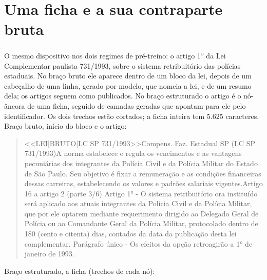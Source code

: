 \documentclass{IOS-Book-Article}
\begin{document}
\section{Uma ficha e a sua contraparte bruta}
O mesmo dispositivo nos dois regimes de pré-treino: o artigo 1\textsuperscript{o} da Lei Complementar paulista 731/1993, sobre o sistema retribuitório das polícias estaduais. No braço bruto ele aparece dentro de um bloco da lei, depois de um cabeçalho de uma linha, gerado por modelo, que nomeia a lei, e de um resumo dela; os artigos seguem como publicados. No braço estruturado o artigo é o nó-âncora de uma ficha, seguido de camadas geradas que apontam para ele pelo identificador. Os dois trechos estão cortados; a ficha inteira tem 5.625 caracteres.
Braço bruto, início do bloco e o artigo:
\begin{quote}\footnotesize\ttfamily\raggedright
<<LEI|\allowbreak{}BRUTO|\allowbreak{}LC SP 731/1993>>\newline
[LEI] Compens. Faz. Estadual SP (LC SP 731/1993) A norma estabelece e regula os vencimentos e as vantagens pecuniárias dos integrantes da Polícia Civil e da Polícia Militar do Estado de São Paulo. Seu objetivo é fixar a remuneração e as condições financeiras dessas carreiras, estabelecendo os valores e padrões salariais vigentes. Artigo 16 a artigo 2 (parte 3/6)\newline
[...]\newline
Artigo 1° - O sistema retribuitório ora instituído será aplicado aos atuais integrantes da Polícia Civil e da Polícia Militar, que por ele optarem mediante requerimento dirigido ao Delegado Geral de Polícia ou ao Comandante Geral da Polícia Militar, protocolado dentro de 180 (cento e oitenta) dias, contados da data da publicação desta lei complementar.\newline
Parágrafo único - Os efeitos da opção retroagirão a 1° de janeiro de 1993.\newline
[...]
\end{quote}
Braço estruturado, a ficha (trechos de cada nó):
\end{document}

